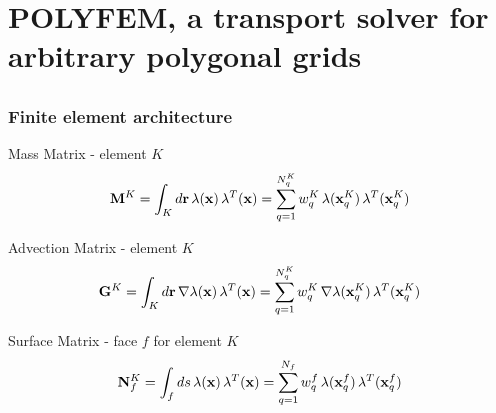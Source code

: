 \documentclass[compress,10pt]{beamer}
\renewcommand{\vec}[1]{\mathbf{#1}}
\begin{document}
\typeout{***********************************************************************************}
\section[POLYFEM]{POLYFEM, a transport solver for arbitrary polygonal grids}
\subsection{}
\begin{frame}[t]\frametitle{Finite element architecture}
\begin{block}{Mass Matrix - element $K$}
\begin{equation*}
{\bf M}^K = \int_{K} d\vec{r} \, \lambda (\vec{x}) \, \lambda^T (\vec{x})  =  \sum\displaylimits_{q=1}^{N_q^K} w_q^K \, \lambda (\vec{x}_q^K) \, \lambda^T (\vec{x}_q^K) 
\end{equation*}
\end{block}
\begin{block}{Advection Matrix - element $K$}
\begin{equation*}
{\bf G}^K = \int_{K} d\vec{r} \, \vec{\nabla} \lambda (\vec{x}) \, \lambda^T (\vec{x}) = \sum\displaylimits_{q=1}^{N_q^K}  w_q^K \, \vec{\nabla} \lambda (\vec{x}_q^K) \, \lambda^T (\vec{x}_q^K) 
\end{equation*}
\end{block}
\begin{block}{Surface Matrix - face $f$ for element $K$}
\begin{equation*}
{\bf N}_f^K = \int_{f} ds \, \lambda (\vec{x}) \, \lambda^T (\vec{x})  = \sum\displaylimits_{q=1}^{N_f}  w_q^f \, \lambda (\vec{x}_q^f) \, \lambda^T (\vec{x}_q^f) 
\end{equation*}
\end{block}
\end{frame}
\end{document}
